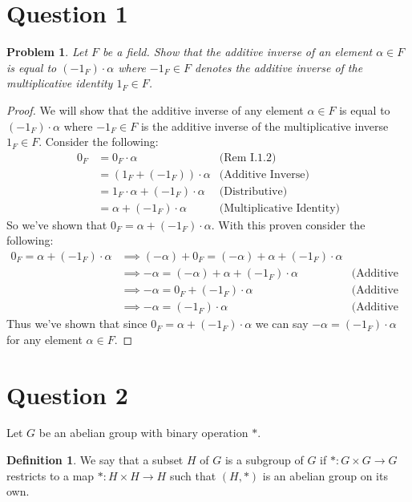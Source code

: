 \documentclass[12pt, letterpaper]{article}
\theoremstyle{plain}
\newtheorem{prob}[theorem]{Problem}
\theoremstyle{definition}
\newtheorem{definition}[theorem]{Definition}
\theoremstyle{remark}
\begin{document}
\section{Question 1}

\begin{prob} 
Let $F$ be a field. Show that the additive inverse of an element $\alpha\in F$ is equal to $(-1_F)\cdot\alpha$ where $-1_F\in F$ denotes the additive inverse of the multiplicative identity $1_F\in F$.
\end{prob}

\begin{proof}
    We will show that the additive inverse of any element $\alpha\in F$ is equal to $(-1_F)\cdot \alpha$ where $-1_F\in F$ is the additive inverse of the multiplicative inverse $1_F\in F$. Consider the following:
    \begin{align*}
        0_F &= 0_F\cdot \alpha            &\text{(Rem I.1.2)} \\
            &= (1_F+(-1_F))\cdot \alpha   &\text{(Additive Inverse)} \\
            &= 1_F\cdot \alpha +(-1_F)\cdot \alpha &\text{(Distributive)} \\
            &= \alpha+(-1_F)\cdot\alpha   &\text{(Multiplicative Identity)}
    \end{align*}
    So we've shown that $0_F=\alpha+(-1_F)\cdot\alpha$. With this proven consider the following:
    \begin{align*}
        0_F=\alpha+(-1_F)\cdot\alpha &\implies (-\alpha)+0_F=(-\alpha)+\alpha+(-1_F)\cdot\alpha \\
                                     &\implies -\alpha= (-\alpha)+\alpha+(-1_F)\cdot\alpha &\text{(Additive Identity)} \\
                                     &\implies -\alpha= 0_F+(-1_F)\cdot\alpha &\text{(Additive Inverse)} \\
                                     &\implies -\alpha= (-1_F)\cdot\alpha &\text{(Additive Identity)}
    \end{align*}
    Thus we've shown that since $0_F=\alpha+(-1_F)\cdot\alpha$ we can say $-\alpha= (-1_F)\cdot\alpha$ for any element $\alpha\in F$.
\end{proof}

\section{Question 2}

Let $G$ be an abelian group with binary operation $*$.
\begin{definition}
    We say that a subset $H$ of $G$ is a  subgroup of $G$ if $*:G\times G\to G$ restricts to a map $*:H\times H\to H$ such that $(H,*)$ is an abelian group on its own.
\end{definition}
\end{document}
